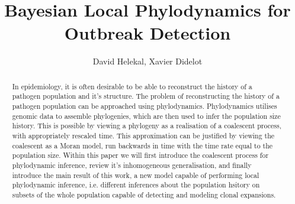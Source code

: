 \documentclass{ieeeaccess}
\theoremstyle{definition}
\begin{document}
\title{Bayesian Local Phylodynamics for Outbreak Detection}
\author{David Helekal, Xavier Didelot}
\begin{abstract}
In epidemiology, it is often desirable to be able to reconstruct the history of a pathogen population and it's structure. The problem of reconstructing the history of a pathogen population can be approached using phylodynamics. Phylodynamics utilises genomic data to assemble phylogenies, which are then used to infer the population size history. This is possible by viewing a phylogeny as a realisation of a coalescent process, with appropriately rescaled time. This approximation can be justified by viewing the coalescent as a Moran model, run backwards in time with the time rate equal to the population size. Within this paper we will first introduce the coalescent process for phylodynamic inference, review it's inhomogeneous generalisation, and finally introduce the main result of this work, a new model capable of performing local phylodynamic inference, i.e. different inferences about the population hsitory on subsets of the whole population capable of detecting and modeling clonal expansions.
\end{abstract}
\titlepgskip=-15pt

\maketitle
\end{document}
